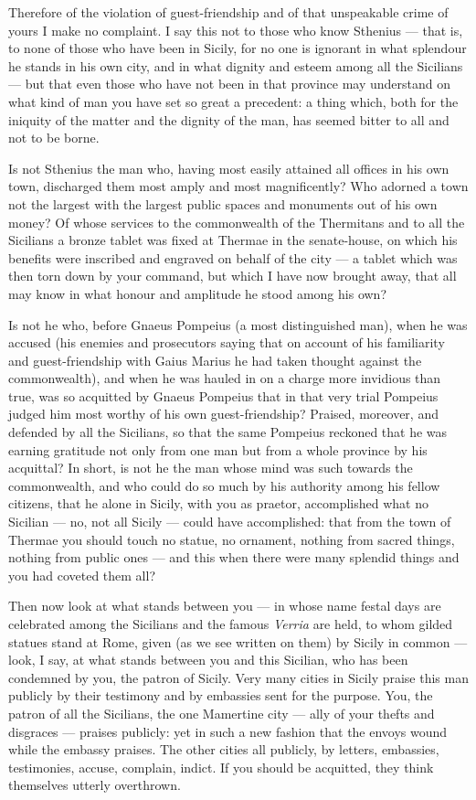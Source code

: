  Therefore of the violation of guest-friendship and of that unspeakable crime of yours I make no complaint. I say this not to those who know Sthenius --- that is, to none of those who have been in Sicily, for no one is ignorant in what splendour he stands in his own city, and in what dignity and esteem among all the Sicilians --- but that even those who have not been in that province may understand on what kind of man you have set so great a precedent: a thing which, both for the iniquity of the matter and the dignity of the man, has seemed bitter to all and not to be borne.

 Is not Sthenius the man who, having most easily attained all offices in his own town, discharged them most amply and most magnificently? Who adorned a town not the largest with the largest public spaces and monuments out of his own money? Of whose services to the commonwealth of the Thermitans and to all the Sicilians a bronze tablet was fixed at Thermae in the senate-house, on which his benefits were inscribed and engraved on behalf of the city --- a tablet which was then torn down by your command, but which I have now brought away, that all may know in what honour and amplitude he stood among his own?

 Is not he who, before Gnaeus Pompeius (a most distinguished man), when he was accused (his enemies and prosecutors saying that on account of his familiarity and guest-friendship with Gaius Marius he had taken thought against the commonwealth), and when he was hauled in on a charge more invidious than true, was so acquitted by Gnaeus Pompeius that in that very trial Pompeius judged him most worthy of his own guest-friendship? Praised, moreover, and defended by all the Sicilians, so that the same Pompeius reckoned that he was earning gratitude not only from one man but from a whole province by his acquittal? In short, is not he the man whose mind was such towards the commonwealth, and who could do so much by his authority among his fellow citizens, that he alone in Sicily, with you as praetor, accomplished what no Sicilian --- no, not all Sicily --- could have accomplished: that from the town of Thermae you should touch no statue, no ornament, nothing from sacred things, nothing from public ones --- and this when there were many splendid things and you had coveted them all?

 Then now look at what stands between you --- in whose name festal days are celebrated among the Sicilians and the famous \textit{Verria} are held, to whom gilded statues stand at Rome, given (as we see written on them) by Sicily in common --- look, I say, at what stands between you and this Sicilian, who has been condemned by you, the patron of Sicily. Very many cities in Sicily praise this man publicly by their testimony and by embassies sent for the purpose. You, the patron of all the Sicilians, the one Mamertine city --- ally of your thefts and disgraces --- praises publicly: yet in such a new fashion that the envoys wound while the embassy praises. The other cities all publicly, by letters, embassies, testimonies, accuse, complain, indict. If you should be acquitted, they think themselves utterly overthrown.

